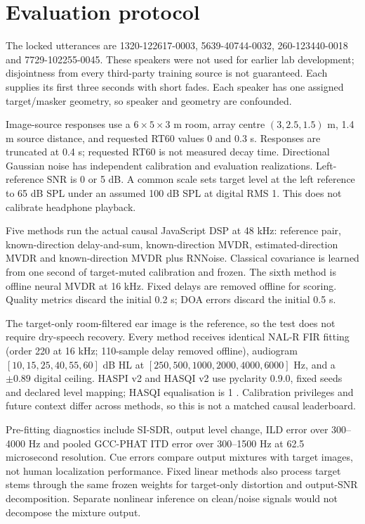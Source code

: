 \documentclass[10pt,a4paper]{article}
\begin{document}
\section{Evaluation protocol}
The locked utterances are 1320-122617-0003, 5639-40744-0032, 260-123440-0018 and 7729-102255-0045. These speakers were not used for earlier lab development; disjointness from every third-party training source is not guaranteed. Each supplies its first three seconds with short fades. Each speaker has one assigned target/masker geometry, so speaker and geometry are confounded.

Image-source responses use a $6\times5\times3$ m room, array centre $(3,2.5,1.5)$ m, 1.4 m source distance, and requested RT60 values 0 and 0.3 s. Responses are truncated at 0.4 s; requested RT60 is not measured decay time. Directional Gaussian noise has independent calibration and evaluation realizations. Left-reference SNR is 0 or 5 dB. A common scale sets target level at the left reference to 65 dB SPL under an assumed 100 dB SPL at digital RMS 1. This does not calibrate headphone playback.

Five methods run the actual causal JavaScript DSP at 48 kHz: reference pair, known-direction delay-and-sum, known-direction MVDR, estimated-direction MVDR and known-direction MVDR plus RNNoise. Classical covariance is learned from one second of target-muted calibration and frozen. The sixth method is offline neural MVDR at 16 kHz. Fixed delays are removed offline for scoring. Quality metrics discard the initial 0.2 s; DOA errors discard the initial 0.5 s.

The target-only room-filtered ear image is the reference, so the test does not require dry-speech recovery. Every method receives identical NAL-R FIR fitting (order 220 at 16 kHz; 110-sample delay removed offline), audiogram $[10,15,25,40,55,60]$ dB HL at $[250,500,1000,2000,4000,6000]$ Hz, and a $\pm0.89$ digital ceiling. HASPI v2 and HASQI v2 use pyclarity 0.9.0, fixed seeds and declared level mapping; HASQI equalisation is 1 \cite{kates}. Calibration privileges and future context differ across methods, so this is not a matched causal leaderboard.

Pre-fitting diagnostics include SI-SDR, output level change, ILD error over 300--4000 Hz and pooled GCC-PHAT ITD error over 300--1500 Hz at 62.5 microsecond resolution. Cue errors compare output mixtures with target images, not human localization performance. Fixed linear methods also process target stems through the same frozen weights for target-only distortion and output-SNR decomposition. Separate nonlinear inference on clean/noise signals would not decompose the mixture output.
\end{document}
